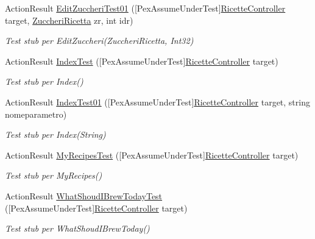 \begin{DoxyCompactItemize}
Action\+Result \mbox{\hyperlink{class_brew_day2_1_1_controllers_1_1_tests_1_1_ricette_controller_test_abf36124647847e45e868fb7443058baa}{Edit\+Zuccheri\+Test01}} (\mbox{[}Pex\+Assume\+Under\+Test\mbox{]}\mbox{\hyperlink{class_brew_day2_1_1_controllers_1_1_ricette_controller}{Ricette\+Controller}} target, \mbox{\hyperlink{class_brew_day2_1_1_models_1_1_zuccheri_ricetta}{Zuccheri\+Ricetta}} zr, int idr)
\begin{DoxyCompactList}\small\item\em Test stub per Edit\+Zuccheri(\+Zuccheri\+Ricetta, Int32)\end{DoxyCompactList}\item 
Action\+Result \mbox{\hyperlink{class_brew_day2_1_1_controllers_1_1_tests_1_1_ricette_controller_test_a8ed2839bd818c9a0c9d73318e0b7031d}{Index\+Test}} (\mbox{[}Pex\+Assume\+Under\+Test\mbox{]}\mbox{\hyperlink{class_brew_day2_1_1_controllers_1_1_ricette_controller}{Ricette\+Controller}} target)
\begin{DoxyCompactList}\small\item\em Test stub per Index()\end{DoxyCompactList}\item 
Action\+Result \mbox{\hyperlink{class_brew_day2_1_1_controllers_1_1_tests_1_1_ricette_controller_test_a09e63eb91bb93131e735af7630c82010}{Index\+Test01}} (\mbox{[}Pex\+Assume\+Under\+Test\mbox{]}\mbox{\hyperlink{class_brew_day2_1_1_controllers_1_1_ricette_controller}{Ricette\+Controller}} target, string nomeparametro)
\begin{DoxyCompactList}\small\item\em Test stub per Index(\+String)\end{DoxyCompactList}\item 
Action\+Result \mbox{\hyperlink{class_brew_day2_1_1_controllers_1_1_tests_1_1_ricette_controller_test_ad2b50dda16a27ee89966b7b5fafc929e}{My\+Recipes\+Test}} (\mbox{[}Pex\+Assume\+Under\+Test\mbox{]}\mbox{\hyperlink{class_brew_day2_1_1_controllers_1_1_ricette_controller}{Ricette\+Controller}} target)
\begin{DoxyCompactList}\small\item\em Test stub per My\+Recipes()\end{DoxyCompactList}\item 
Action\+Result \mbox{\hyperlink{class_brew_day2_1_1_controllers_1_1_tests_1_1_ricette_controller_test_a779126b201c0615aed5a7e711652ea0e}{What\+Shoud\+I\+Brew\+Today\+Test}} (\mbox{[}Pex\+Assume\+Under\+Test\mbox{]}\mbox{\hyperlink{class_brew_day2_1_1_controllers_1_1_ricette_controller}{Ricette\+Controller}} target)
\begin{DoxyCompactList}\small\item\em Test stub per What\+Shoud\+I\+Brew\+Today()\end{DoxyCompactList}\end{DoxyCompactItemize}


